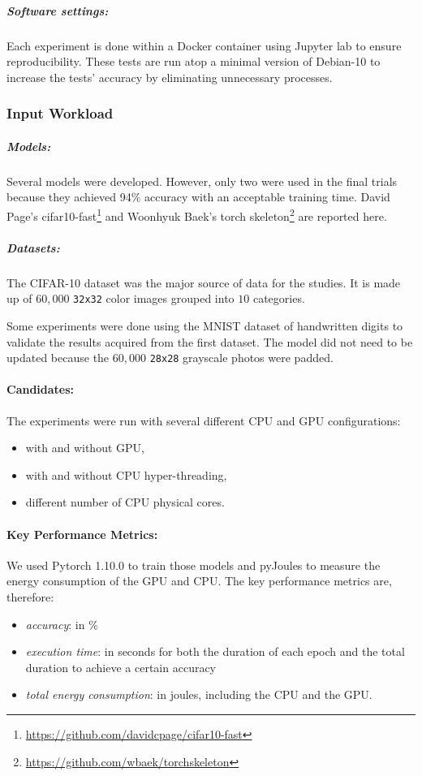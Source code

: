 \subparagraph{Software settings:}
Each experiment is done within a Docker container using Jupyter lab to ensure reproducibility.
These tests are run atop a minimal version of Debian-10 to increase the tests' accuracy by eliminating unnecessary processes.

\subsubsection{Input Workload}
\subparagraph{Models:}
Several models were developed.
However, only two were used in the final trials because they achieved 94\% accuracy with an acceptable training time.
David Page's \textsf{cifar10-fast}\footnote{\url{https://github.com/davidcpage/cifar10-fast}} and Woonhyuk Baek's torch skeleton\footnote{\url{https://github.com/wbaek/torchskeleton}} are reported here.

\subparagraph{Datasets:}
The CIFAR-10 dataset was the major source of data for the studies.
It is made up of $60,000$ \texttt{32x32} color images grouped into $10$ categories.

Some experiments were done using the MNIST dataset of handwritten digits to validate the results acquired from the first dataset.
The model did not need to be updated because the $60,000$ \texttt{28x28} grayscale photos were padded.

\paragraph{Candidates:}
The experiments were run with several different CPU and GPU configurations:
\begin{itemize}
    \item with and without GPU,
    \item with and without CPU hyper-threading,
    \item different number of CPU physical cores.
\end{itemize}

\paragraph{Key Performance Metrics:}
We used Pytorch 1.10.0 to train those models and pyJoules to measure the energy consumption of the GPU and CPU.
The key performance metrics are, therefore:
\begin{itemize}
    \item \emph{accuracy}: in \%
    \item \emph{execution time}: in seconds for both the duration of each epoch and the total duration to achieve a certain accuracy
    \item \emph{total energy consumption}: in joules, including the CPU and the GPU.
\end{itemize}


